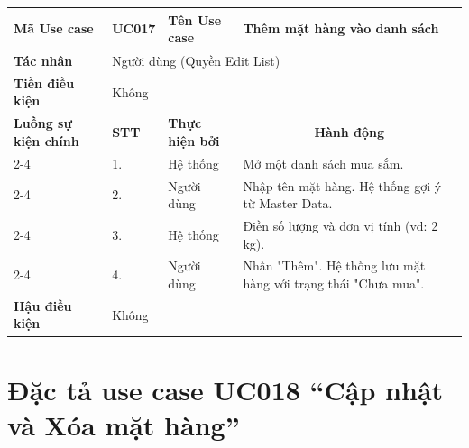 \begin{longtable}{|p{2.7cm}|p{0.8cm}|p{2.6cm}|p{7.3cm}|}
\hline
\cellcolor[HTML]{D5F5E3}\textbf{Mã Use case} & \multicolumn{1}{l|}{UC017} & \cellcolor[HTML]{D5F5E3}\textbf{Tên Use case} & Thêm mặt hàng vào danh sách \\ \hline
\cellcolor[HTML]{D5F5E3}\textbf{Tác nhân} & \multicolumn{3}{p{10.7cm}|}{Người dùng (Quyền Edit List)} \\ \hline
\cellcolor[HTML]{D5F5E3}\textbf{Tiền điều kiện} & \multicolumn{3}{p{10.7cm}|}{Không} \\ \hline

\cellcolor[HTML]{D5F5E3}\textbf{Luồng sự kiện chính} & \cellcolor[HTML]{FDEBD0}\textbf{STT} & \cellcolor[HTML]{FDEBD0}\textbf{Thực hiện bởi} & \multicolumn{1}{c|}{\cellcolor[HTML]{FDEBD0}\textbf{Hành động}} \\ \cline{2-4} 
\cellcolor[HTML]{D5F5E3} & 1. & Hệ thống & Mở một danh sách mua sắm. \\ \cline{2-4} 
\cellcolor[HTML]{D5F5E3} & 2. & Người dùng & Nhập tên mặt hàng. Hệ thống gợi ý từ Master Data. \\ \cline{2-4} 
\cellcolor[HTML]{D5F5E3} & 3. & Hệ thống & Điền số lượng và đơn vị tính (vd: 2 kg). \\ \cline{2-4} 
\cellcolor[HTML]{D5F5E3} & 4. & Người dùng & Nhấn "Thêm". Hệ thống lưu mặt hàng với trạng thái "Chưa mua". \\ \hline

\cellcolor[HTML]{D5F5E3}\textbf{Hậu điều kiện} & \multicolumn{3}{p{10.7cm}|}{Không} \\ \hline
\end{longtable}
\endgroup

\section{Đặc tả use case UC018 ``Cập nhật và Xóa mặt hàng''}
\vspace{0.5cm}

\begingroup
\renewcommand{\arraystretch}{1.5}

